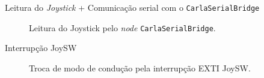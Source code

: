 \documentclass{if-beamer}
\begin{document}
\begin{frame}{Leitura do \textit{Joystick} + Comunicação serial com o \texttt{CarlaSerialBridge}}
	
	\begin{figure}[H]
		\centering
		\caption{Leitura do Joystick pelo \textit{node} \texttt{CarlaSerialBridge}.}
		\label{fig:TestJoyADC}
	\end{figure}
	
\end{frame}       

\begin{frame}{Interrupção JoySW}
	
	\begin{figure}[H]
		\centering
		\caption{Troca de modo de condução pela interrupção EXTI JoySW.}
		\label{fig:TestJoySW}
	\end{figure}



\end{frame}
\end{document}
